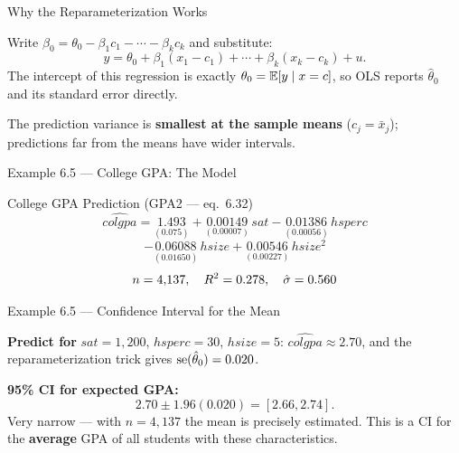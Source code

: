 \documentclass[aspectratio=169, 12pt]{beamer}
\begin{document}
\begin{frame}{Why the Reparameterization Works}

  \begin{keybox}
    Write $\beta_0 = \theta_0 - \beta_1 c_1 - \cdots - \beta_k c_k$ and substitute:
    \[
      y = \theta_0 + \beta_1(x_1 - c_1) + \cdots + \beta_k(x_k - c_k) + u .
    \]
    The intercept of this regression is exactly $\theta_0 = \operatorname{\mathbb{E}}[y \mid x = c]$, so OLS
    reports $\hat\theta_0$ and its standard error directly.
  \end{keybox}

  \medskip

  \begin{highlightbox}
    The prediction variance is \textbf{smallest at the sample means} ($c_j = \bar{x}_j$);
    predictions far from the means have wider intervals.
  \end{highlightbox}

\end{frame}

\begin{frame}{Example 6.5 --- College GPA: The Model}

  \begin{examplebox}{College GPA Prediction (GPA2 --- eq.\ 6.32)}
    \[
      \widehat{colgpa} = \underset{(0.075)}{1.493}
        + \underset{(0.00007)}{0.00149}\, sat
        - \underset{(0.00056)}{0.01386}\, hsperc
    \]
    \[
        - \underset{(0.01650)}{0.06088}\, hsize
        + \underset{(0.00227)}{0.00546}\, hsize^2
    \]
    \[
      n = 4{,}137, \quad R^2 = 0.278, \quad \hat\sigma = 0.560
    \]
  \end{examplebox}

\end{frame}

\begin{frame}{Example 6.5 --- Confidence Interval for the Mean}

  \textbf{Predict for} $sat = 1{,}200$, $hsperc = 30$, $hsize = 5$:
  $\widehat{colgpa} \approx 2.70$, and the reparameterization trick gives
  $\operatorname{se}(\hat\theta_0) = 0.020$.

  \medskip

  \begin{keybox}
    \textbf{95\% CI for expected GPA:}
    \[
      2.70 \pm 1.96(0.020) = [2.66, 2.74] .
    \]
    Very narrow --- with $n = 4{,}137$ the mean is precisely estimated. This is a CI for
    the \textbf{average} GPA of all students with these characteristics.
  \end{keybox}

\end{frame}
\end{document}
